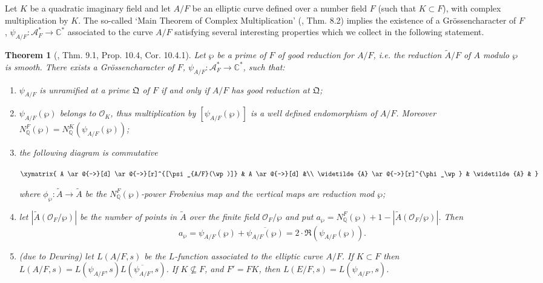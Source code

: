 \documentclass[12pt]{article}
\newtheorem*{thm}{Theorem}
\theoremstyle{definition}
\newcommand{\Complex}{\mathbb{C}}
\newcommand{\Rats}{\mathbb{Q}}
\newcommand{\RInts}{\mathcal{O}_K}
\begin{document}
Let $K$ be a quadratic imaginary field and let $A/F$ be an
elliptic curve defined over a number field $F$ (such that
$K\subset F$), with complex multiplication by $K$. The so-called
`Main Theorem of Complex Multiplication' (\cite{sil2}, Thm. 8.2)
implies the existence of a Gr\"ossencharacter of $F$,
$\psi_{A/F}:\mathcal{A}_F^\ast\to \Complex^\ast$ associated to the
curve $A/F$ satisfying several interesting properties which we
collect in the following statement.

\begin{thm}[\cite{sil2}, Thm. 9.1, Prop. 10.4, Cor. 10.4.1]
\label{grossen} Let $\wp$ be a prime of $F$ of good reduction for
$A/F$, i.e. the reduction $\widetilde{A}/F$ of $A$ modulo $\wp$ is
smooth. There exists a Gr\"ossencharacter of $F$,
$\psi_{A/F}:\mathcal{A}_F^\ast \to \Complex^\ast$, such that:
\begin{enumerate}
\item $\psi_{A/F}$ is unramified at a prime $\mathfrak{Q}$ of $F$
if and only if $A/F$ has good reduction at $\mathfrak{Q}$;

\item $\psi_{A/F}(\wp)$ belongs to $\RInts$, thus multiplication
by $[\psi_{A/F}(\wp)]$ is a well defined endomorphism of $A/F$.
Moreover $N_\Rats^F(\wp)=N_\Rats^K(\psi_{A/F}(\wp))$;

\item the following diagram is commutative
\begin{center}
$\xymatrix{ 
A \ar@{->}[d] \ar@{->}[r]^{[\psi_{A/F}(\wp)]} & A \ar@{->}[d] &\\
\widetilde{A} \ar@{->}[r]^{\phi_\wp} & \widetilde{A} &
}$
\end{center}
where $\phi_\wp:\widetilde{A}\to\widetilde{A}$ be the
$N_\Rats^F(\wp)$-power Frobenius map and the vertical maps are
reduction mod $\wp$;

\item let $|\widetilde{A}(\mathcal{O}_F/\wp)|$ be the number of
points in $\widetilde{A}$ over the finite field
$\mathcal{O}_F/\wp$ and put $a_\wp=N_{\Rats}^F(\wp) +1 -
|\widetilde{A}(\mathcal{O}_F/\wp)|$. Then
$$a_{\wp}=\psi_{A/F}(\wp)+\overline{\psi_{A/F}(\wp)}=2\cdot \Re
(\psi_{A/F}(\wp)).$$

\item (due to Deuring) let $L(A/F,s)$ be the $L$-function
associated to the elliptic curve $A/F$. If $K\subset F$ then
$L(A/F,s)=L(\psi_{A/F},s)L(\overline{\psi_{A/F}},s)$. If
$K\nsubseteq F$, and $F'=FK$, then $L(E/F,s)=L(\psi_{A/F'},s)$.
\end{enumerate}
\end{thm}
\end{document}
